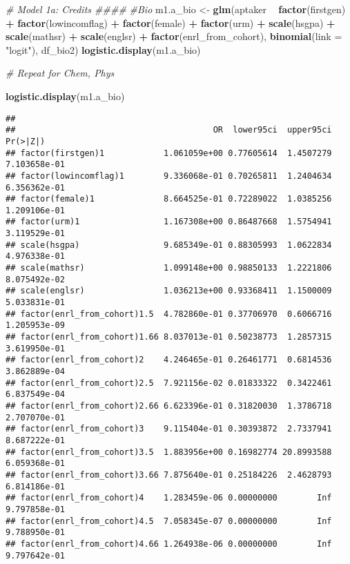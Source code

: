 \documentclass[]{article}
\newenvironment{Shaded}{\begin{snugshade}}{\end{snugshade}}
\newcommand{\KeywordTok}[1]{\textcolor[rgb]{0.13,0.29,0.53}{\textbf{#1}}}
\newcommand{\DataTypeTok}[1]{\textcolor[rgb]{0.13,0.29,0.53}{#1}}
\newcommand{\StringTok}[1]{\textcolor[rgb]{0.31,0.60,0.02}{#1}}
\newcommand{\CommentTok}[1]{\textcolor[rgb]{0.56,0.35,0.01}{\textit{#1}}}
\newcommand{\OperatorTok}[1]{\textcolor[rgb]{0.81,0.36,0.00}{\textbf{#1}}}
\newcommand{\NormalTok}[1]{#1}
\begin{document}
\begin{Shaded}
\begin{Highlighting}[]
\CommentTok{# Model 1a: Credits ####}
\CommentTok{#Bio}
\NormalTok{m1.a_bio <-}\StringTok{ }\KeywordTok{glm}\NormalTok{(aptaker }\OperatorTok{~}\StringTok{ }\KeywordTok{factor}\NormalTok{(firstgen) }\OperatorTok{+}\StringTok{ }\KeywordTok{factor}\NormalTok{(lowincomflag)  }\OperatorTok{+}\StringTok{ }\KeywordTok{factor}\NormalTok{(female) }\OperatorTok{+}\StringTok{ }\KeywordTok{factor}\NormalTok{(urm) }\OperatorTok{+}
\StringTok{                 }\KeywordTok{scale}\NormalTok{(hsgpa) }\OperatorTok{+}\StringTok{ }\KeywordTok{scale}\NormalTok{(mathsr) }\OperatorTok{+}\StringTok{ }\KeywordTok{scale}\NormalTok{(englsr) }\OperatorTok{+}\StringTok{ }\KeywordTok{factor}\NormalTok{(enrl_from_cohort),}
               \KeywordTok{binomial}\NormalTok{(}\DataTypeTok{link =} \StringTok{"logit"}\NormalTok{), df_bio2)}
\KeywordTok{logistic.display}\NormalTok{(m1.a_bio)}

\CommentTok{# Repeat for Chem, Phys}
\end{Highlighting}
\end{Shaded}

\begin{Shaded}
\begin{Highlighting}[]
\KeywordTok{logistic.display}\NormalTok{(m1.a_bio)}
\end{Highlighting}
\end{Shaded}

\begin{verbatim}
##  
##                                        OR  lower95ci  upper95ci     Pr(>|Z|)
## factor(firstgen)1            1.061059e+00 0.77605614  1.4507279 7.103658e-01
## factor(lowincomflag)1        9.336068e-01 0.70265811  1.2404634 6.356362e-01
## factor(female)1              8.664525e-01 0.72289022  1.0385256 1.209106e-01
## factor(urm)1                 1.167308e+00 0.86487668  1.5754941 3.119529e-01
## scale(hsgpa)                 9.685349e-01 0.88305993  1.0622834 4.976338e-01
## scale(mathsr)                1.099148e+00 0.98850133  1.2221806 8.075492e-02
## scale(englsr)                1.036213e+00 0.93368411  1.1500009 5.033831e-01
## factor(enrl_from_cohort)1.5  4.782860e-01 0.37706970  0.6066716 1.205953e-09
## factor(enrl_from_cohort)1.66 8.037013e-01 0.50238773  1.2857315 3.619950e-01
## factor(enrl_from_cohort)2    4.246465e-01 0.26461771  0.6814536 3.862889e-04
## factor(enrl_from_cohort)2.5  7.921156e-02 0.01833322  0.3422461 6.837549e-04
## factor(enrl_from_cohort)2.66 6.623396e-01 0.31820030  1.3786718 2.707070e-01
## factor(enrl_from_cohort)3    9.115404e-01 0.30393872  2.7337941 8.687222e-01
## factor(enrl_from_cohort)3.5  1.883956e+00 0.16982774 20.8993588 6.059368e-01
## factor(enrl_from_cohort)3.66 7.875640e-01 0.25184226  2.4628793 6.814186e-01
## factor(enrl_from_cohort)4    1.283459e-06 0.00000000        Inf 9.797858e-01
## factor(enrl_from_cohort)4.5  7.058345e-07 0.00000000        Inf 9.788950e-01
## factor(enrl_from_cohort)4.66 1.264938e-06 0.00000000        Inf 9.797642e-01
\end{verbatim}
\end{document}
